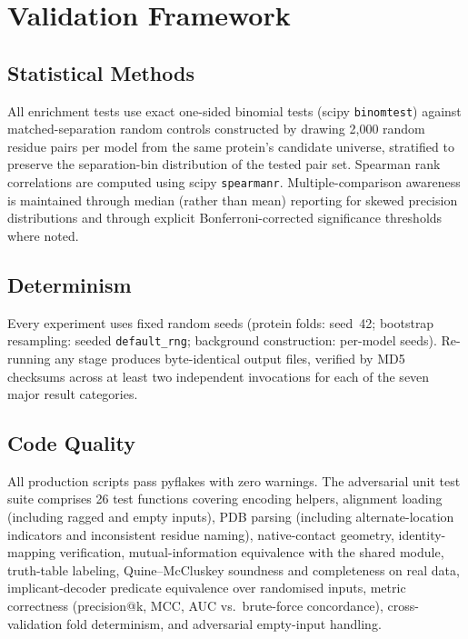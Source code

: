 \section{Validation Framework}
\label{sec:methods-validation}

\subsection{Statistical Methods}
All enrichment tests use exact one-sided binomial tests (scipy
\texttt{binomtest}) against matched-separation random controls constructed by
drawing 2{,}000 random residue pairs per model from the same protein's
candidate universe, stratified to preserve the separation-bin distribution of
the tested pair set.  Spearman rank correlations are computed using scipy
\texttt{spearmanr}.  Multiple-comparison awareness is maintained through
median (rather than mean) reporting for skewed precision distributions and
through explicit Bonferroni-corrected significance thresholds where noted.

\subsection{Determinism}
Every experiment uses fixed random seeds (protein folds: seed~42; bootstrap
resampling: seeded \texttt{default\_rng}; background construction: per-model
seeds).  Re-running any stage produces byte-identical output files, verified
by MD5 checksums across at least two independent invocations for each of the
seven major result categories.

\subsection{Code Quality}
All production scripts pass pyflakes with zero warnings.  The adversarial
unit test suite comprises 26 test functions covering encoding helpers,
alignment loading (including ragged and empty inputs), PDB parsing (including
alternate-location indicators and inconsistent residue naming), native-contact
geometry, identity-mapping verification, mutual-information equivalence with
the shared module, truth-table labeling, Quine--McCluskey soundness and
completeness on real data, implicant-decoder predicate equivalence over
randomised inputs, metric correctness (precision@k, MCC, AUC vs.\ brute-force
concordance), cross-validation fold determinism, and adversarial empty-input
handling.
